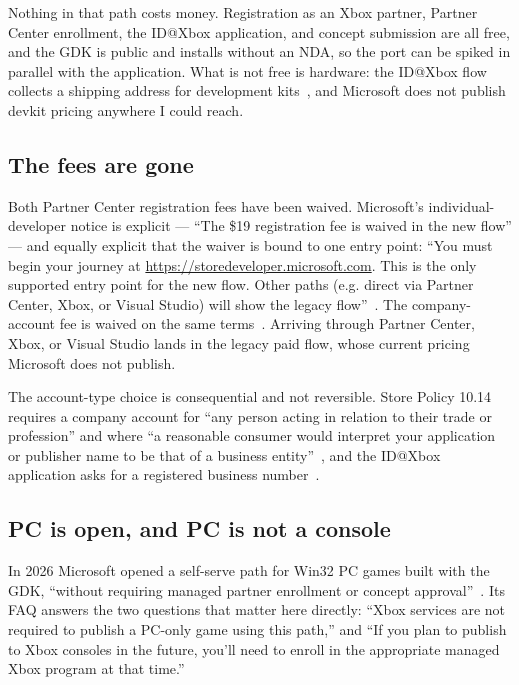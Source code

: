 \documentclass[10pt,letterpaper,twocolumn]{article}
\begin{document}
Nothing in that path costs money. Registration as an Xbox partner, Partner Center enrollment, the ID@Xbox application, and concept submission are all free, and the GDK is public and installs without an NDA, so the port can be spiked in parallel with the application. What is not free is hardware: the ID@Xbox flow collects a shipping address for development kits~\cite{msJoinId}, and Microsoft does not publish devkit pricing anywhere I could reach.

\subsection{The fees are gone}

Both Partner Center registration fees have been waived. Microsoft's individual-developer notice is explicit --- ``The \$19 registration fee is waived in the new flow'' --- and equally explicit that the waiver is bound to one entry point: ``You must begin your journey at \url{https://storedeveloper.microsoft.com}. This is the only supported entry point for the new flow. Other paths (e.g. direct via Partner Center, Xbox, or Visual Studio) will show the legacy flow''~\cite{msIndividualFee}. The company-account fee is waived on the same terms~\cite{msCompanyFee}. Arriving through Partner Center, Xbox, or Visual Studio lands in the legacy paid flow, whose current pricing Microsoft does not publish.

The account-type choice is consequential and not reversible. Store Policy 10.14 requires a company account for ``any person acting in relation to their trade or profession'' and where ``a reasonable consumer would interpret your application or publisher name to be that of a business entity''~\cite{msStorePolicies}, and the ID@Xbox application asks for a registered business number~\cite{msJoinId}.

\subsection{PC is open, and PC is not a console}

In 2026 Microsoft opened a self-serve path for Win32 PC games built with the GDK, ``without requiring managed partner enrollment or concept approval''~\cite{msPcSelfServe}. Its FAQ answers the two questions that matter here directly: ``Xbox services are not required to publish a PC-only game using this path,'' and ``If you plan to publish to Xbox consoles in the future, you'll need to enroll in the appropriate managed Xbox program at that time.''
\end{document}
